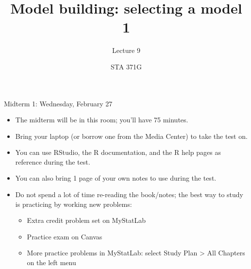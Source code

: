 \documentclass{beamer}\usepackage[]{graphicx}\usepackage[]{color}
\title{Model building: selecting a model 1}
\subtitle{Lecture 9}
\author{STA 371G}
\begin{document}
  
  

  \frame{\maketitle}



  \begin{darkframes}
    \begin{frame}{Midterm 1: Wednesday, February 27}
      \begin{itemize}[<+->]
        \item The midterm will be in this room; you'll have 75 minutes.
        \item Bring your laptop (or borrow one from the Media Center) to take the test on.
        \item You can use RStudio, the R documentation, and the R help pages as reference during the test.
        \item You can also bring 1 page of your own notes to use during the test.
        \item Do not spend a lot of time re-reading the book/notes; the best way to study is \alert{practicing by working new problems}:
          \begin{itemize}
            \item Extra credit problem set on MyStatLab
            \item Practice exam on Canvas
            \item More practice problems in MyStatLab: select Study Plan > All Chapters on the left menu
          \end{itemize}
      \end{itemize}
    \end{frame}

    \begin{frame}
    \end{frame}


\end{darkframes}
\end{document}
